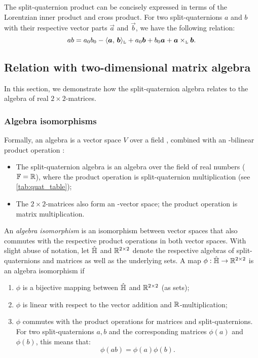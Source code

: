 The split-quaternion product can be concisely expressed in terms of the Lorentzian inner product and cross product. For two split-quaternions $a$ and $b$ with their respective vector parts $\vec{a}$ and $\vec{b}$, we have the following relation:
\begin{equation}
    ab = a_0 b_0 - \lorinner{\vec{a}}{\vec{b}} + a_0 \vec{b} + b_0 \vec{a} + \lorcrossp{\vec{a}}{\vec{b}}.
\end{equation}

\subsection{Relation with two-dimensional matrix algebra}
\label{ssec:quat_isomorphism}
In this section, we demonstrate how the split-quaternion algebra relates to the algebra of real $2\times2$-matrices.

\subsubsection{Algebra isomorphisms} 
Formally, an algebra is a vector space \(V\) over a field \field, combined with an \field-bilinear product operation \cite{Schuller2014}:
\begin{itemize}
    \item The split-quaternion algebra is an algebra over the field of real numbers (\(\mathbb{F} = \mathbb{R}\)), where the product operation is split-quaternion multiplication (see \cref{tab:quat_table});
    \item The \(2\times2\)-matrices also form an \real-vector space; the product operation is matrix multiplication.
\end{itemize}

An \emph{algebra isomorphism} is an isomorphism between vector spaces that also commutes with the respective product operations in both vector spaces. With slight abuse of notation, let  $\hat{\mathbb{H}}$ and $\mathbb{R}^{2\times 2}$ denote the respective algebras of split-quaternions and matrices as well as the underlying sets. A map $\phi: \hat{\mathbb{H}} \to \mathbb{R}^{2 \times 2}$ is  an algebra isomorphism if \cite{Lang2002}
\begin{enumerate}[label=(\roman*), align=left, leftmargin=1.5cm]
    \item \(\phi \) is a bijective mapping between $\hat{\mathbb{H}}$ and $\mathbb{R}^{2\times 2}$ (as sets);
    \item \(\phi\) is linear with respect to the vector addition and $\mathbb{R}$-multiplication;   
    \item \(\phi\) commutes with the product operations for matrices and split-quaternions. For two split-quaternions $a, b$ and the corresponding matrices $\phi(a)$ and $\phi(b)$, this means that:
    \begin{equation}
        \phi(ab) = \phi(a)\phi(b).
    \end{equation}
\end{enumerate}

